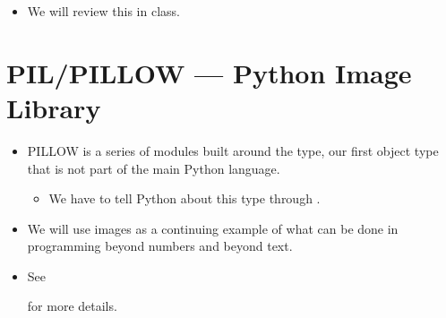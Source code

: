 \documentclass[letterpaper,10pt,english]{sphinxmanual}
\begin{document}
\begin{itemize}
\begin{sphinxVerbatim}[commandchars=\\\{\}]
  
  
          
      
          
\end{sphinxVerbatim}

\item {} 
We will review this in class.

\end{itemize}


\section{PIL/PILLOW — Python Image Library}
\label{\detokenize{lecture_notes/lec07_modules_images:pil-pillow-python-image-library}}\begin{itemize}
\item {} 
PILLOW is a series of modules built around the  type, our first
object type that is not part of the main Python language.
\begin{itemize}
\item {} 
We have to tell Python about this type through .

\end{itemize}

\item {} 
We will use images as a continuing example of what can be done in
programming beyond numbers and beyond text.

\item {} 
See


for more details.

\end{itemize}
\end{document}
